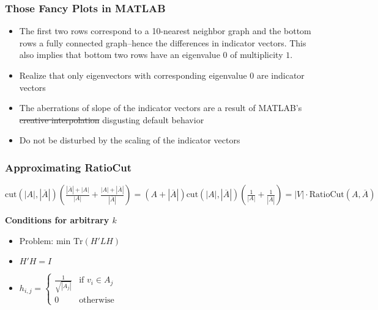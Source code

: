 \documentclass{article}
\begin{document}
        \subsubsection{Those Fancy Plots in MATLAB}
            \begin{itemize}
                \item The first two rows correspond to a 10-nearest neighbor
graph and the bottom rows a fully connected graph--hence the differences in
indicator vectors. This also implies that bottom two rows have an eigenvalue
\ensuremath{0} of multiplicity \ensuremath{1}.
                \item Realize that only eigenvectors with corresponding
eigenvalue \ensuremath{0} are indicator vectors
                \item The aberrations of slope of the indicator vectors are a
result of MATLAB's \sout{creative interpolation} disgusting default behavior
                \item Do not be disturbed by the scaling of the indicator vectors
            \end{itemize}

        \subsubsection{Approximating RatioCut}
            \begin{math}\text{cut}(|A|,|\overline{A}|)\left(\frac{|\overline{A}|+|A|}
{|A|}+\frac{|A|+|\overline{A}|}{|\overline{A}|}\right)=\left(A+|\overline{A}|\right)
\text{cut}(|A|,|\overline{A}|)\left(\frac{1}{|A|}+\frac{1}{|\overline{A}|}\right)
=|V|\cdot \text{RatioCut}(A, \overline{A}) 
            \end{math}

            \textbf{Conditions for arbitrary \ensuremath{k}} 
            \begin{itemize}
                \item Problem: min \ensuremath{\text{Tr}(H'LH)}
                \item \ensuremath{H'H = I}
                \item \begin{math}
                    h_{i,j}= \left\{
                    \begin{array}{lr}
                        \frac{1}{\sqrt{|A_j|}}&\text{if } v_i \in A_j\\
                        0&\text{otherwise}
                    \end{array}\right.
            \end{math}
            \end{itemize}
\end{document}
